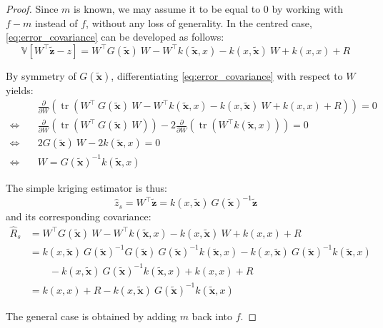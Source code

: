 \begin{proof}
	Since $m$ is known, we may assume it to be equal to $0$ by working with $f-m$ instead of $f$, without any loss of generality. In the centred case, \eqref{eq:error_covariance} can be developed as follows:
	\begin{equation}
		\mathbb{V}[W^\top\tilde{\mathbf{z}}-z]=W^\top G(\tilde{\mathbf{x}})\:W-W^\top k(\tilde{\mathbf{x}},x)-k(x,\tilde{\mathbf{x}})\:W+k(x,x)+R
	\end{equation}

	By symmetry of $G(\tilde{\mathbf{x}})$, differentiating \eqref{eq:error_covariance} with respect to $W$ yields:
	\begin{equation}
		\begin{aligned}
		&\frac{\partial}{\partial W}\left(\operatorname{tr}\left(W^\top\:G(\tilde{\mathbf{x}})\:W-W^\top k(\tilde{\mathbf{x}},x)-k(x,\tilde{\mathbf{x}})\:W+k(x,x)+R\right)\right)=0\\
		\iff\quad&\frac{\partial}{\partial W}\left(\operatorname{tr}\left(W^\top\:G(\tilde{\mathbf{x}})\:W\right)\right)-2\frac{\partial}{\partial W}\left(\operatorname{tr}\left(W^\top k(\tilde{\mathbf{x}},x)\right)\right)=0\\
		\iff\quad&2G(\tilde{\mathbf{x}})\:W-2k(\tilde{\mathbf{x}},x)=0\\
		\iff\quad&W=G(\tilde{\mathbf{x}})^{-1}k(\tilde{\mathbf{x}},x)
		\end{aligned}
	\end{equation}

	The simple kriging estimator is thus:
	\begin{equation}
		\hat{z}_s=W^\top\tilde{\mathbf{z}}=k(x,\tilde{\mathbf{x}})\:G(\tilde{\mathbf{x}})^{-1}\tilde{\mathbf{z}}
	\end{equation}
	and its corresponding covariance:
	\begin{equation}
		\begin{aligned}
		\hat{R}_s&=W^\top G(\tilde{\mathbf{x}})\:W-W^\top k(\tilde{\mathbf{x}},x)-k(x,\tilde{\mathbf{x}})\:W+k(x,x)+R\\
		&=k(x,\tilde{\mathbf{x}})\:G(\tilde{\mathbf{x}})^{-1}G(\tilde{\mathbf{x}})\:G(\tilde{\mathbf{x}})^{-1}k(\tilde{\mathbf{x}},x)-k(x,\tilde{\mathbf{x}})\:G(\tilde{\mathbf{x}})^{-1}k(\tilde{\mathbf{x}},x)\\
		&\qquad-k(x,\tilde{\mathbf{x}})\:G(\tilde{\mathbf{x}})^{-1}k(\tilde{\mathbf{x}},x)+k(x,x)+R\\
		&=k(x,x)+R-k(x,\tilde{\mathbf{x}})\:G(\tilde{\mathbf{x}})^{-1}k(\tilde{\mathbf{x}},x)
		\end{aligned}
	\end{equation}

	The general case is obtained by adding $m$ back into $f$.
\end{proof}

